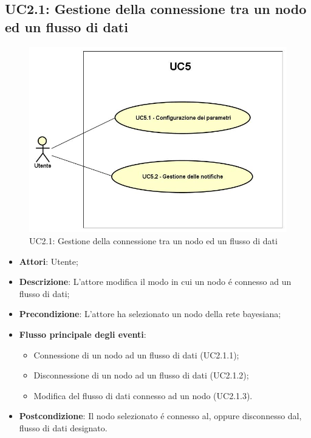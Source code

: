 \subsection{UC2.1: Gestione della connessione tra un nodo ed un flusso di dati}
\begin{figure} [H]
	\centering
	\includegraphics[scale=0.45]{Img/UC5}
	\caption{UC2.1: Gestione della connessione tra un nodo ed un flusso di dati}\label{}
\end{figure}
\begin{itemize}
	\item \textbf{Attori}: Utente;
	\item \textbf{Descrizione}: L'attore modifica il modo in cui un nodo é connesso ad un flusso di dati;
	\item \textbf{Precondizione}: L'attore ha selezionato un nodo della rete bayesiana;
	\item \textbf{Flusso principale degli eventi}:
	\begin{itemize}
		\item Connessione di un nodo ad un flusso di dati (UC2.1.1);
		\item Disconnessione di un nodo ad un flusso di dati (UC2.1.2);
		\item Modifica del flusso di dati connesso ad un nodo (UC2.1.3).
	\end{itemize}
	\item \textbf{Postcondizione}: Il nodo selezionato é connesso al, oppure disconnesso dal, flusso di dati designato.
\end{itemize}
